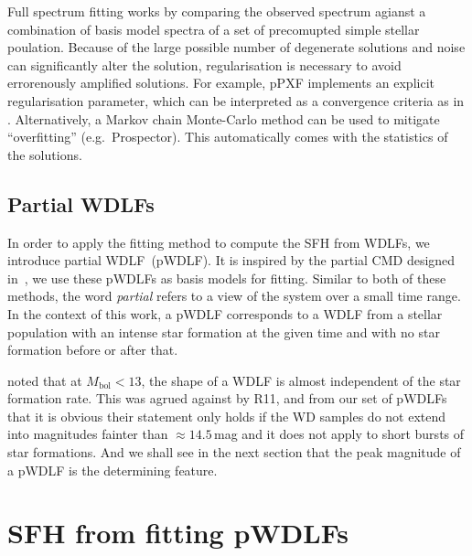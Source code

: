 \documentclass[fleqn,usenatbib]{mnras}
\begin{document}
Full spectrum fitting works by comparing the observed spectrum agianst a
combination of basis model spectra of a set of precomupted simple stellar
poulation. Because of the large possible number of degenerate solutions and
noise can significantly alter the solution, regularisation is necessary to
avoid errorenously amplified solutions. For example, pPXF implements an explicit
regularisation parameter, which can be interpreted as a convergence criteria as
in \citet{2013MNRAS.434.1549R}. Alternatively, a Markov chain Monte-Carlo method
can be used to mitigate ``overfitting'' (e.g.\ Prospector). This automatically
comes with the statistics of the solutions.

\subsection{Partial WDLFs}
In order to apply the fitting method to compute the SFH from WDLFs, we introduce
partial WDLF~(pWDLF). It is inspired by the partial CMD designed
in~\citep{2006A&A...459..783C}, we use these pWDLFs as basis models
for fitting. Similar to both of these methods, the word \textit{partial} 
refers to a view of the system over a small time range. In the context of this
work, a pWDLF corresponds to a WDLF from a stellar population with an intense
star formation at the given time and with no star formation before or after
that.

\citet{2008ApJ...682L.109I} noted that at $M_{\mathrm{bol}} < 13$, the shape of
a WDLF is almost independent of the star formation rate. This was agrued
against by R11, and from our set of pWDLFs that it is obvious their statement
only holds if the WD samples do not extend into magnitudes fainter than
$\approx14.5$\,mag and it does not apply to short bursts of star formations.
And we shall see in the next section that the peak magnitude of a pWDLF is the
determining feature.

\section{SFH from fitting pWDLFs}

\end{document}
